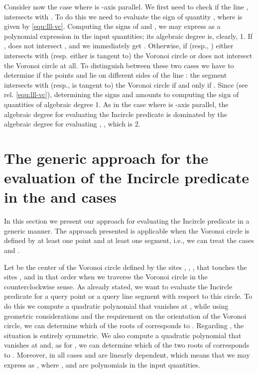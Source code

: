 \documentclass[letterpaper,11pt]{article}
\newcommand{\incircle}{\textsf{Incircle}\xspace}
\newcommand{\vor}{Voronoi\xspace}
\newcommand{\pps}{\xspace}
\newcommand{\pss}{\xspace}
\begin{document}
{Consider now the case where  is -axis parallel. We first need
to check if the line , intersects with . To do
this we need to evaluate the sign of quantity , where
 is given by \eqref{equ:lll-vc}. Computing the signs of
 and , we may express  as a
polynomial expression in the input quantities; its algebraic degree is,
clearly, 1. If ,  does not intersect
, and we immediately get .
Otherwise, if  (resp., )
 either intersects with (resp. either is tangent to) the
\vor circle or does not intersect the \vor circle at all. To
distinguish between these two cases we have to determine if the points
 and  lie on different sides of the line : the segment
 intersects with (resp., is tangent to) the \vor circle
 if and only if . Since
 (see rel. \eqref{equ:lll-vc}), determining
the signs  and  amounts to computing the
sign of quantities of algebraic degree 1. As in the case where  is
-axis parallel, the algebraic degree for evaluating the \incircle
predicate is dominated by the algebraic degree for evaluating
, , which is 2.




\section{The generic approach for the evaluation of the \incircle
  predicate in the \pps and \pss cases}\label{sec:generic}

In this section we present our approach for evaluating the
\incircle predicate in a generic manner. The approach presented is
applicable when the \vor circle is defined by at least one point and
at least one segment, i.e., we can treat the cases \pps and \pss.

Let  be the center of the Voronoi circle defined by the sites
, , , that touches the sites ,  and  in
that order when we traverse the \vor circle in the counterclockwise
sense.
As already stated, we want to evaluate the \incircle predicate for a
query point or a query line segment with respect to this circle.
To do this we compute a quadratic polynomial  that 
vanishes at , while using geometric considerations and the
requirement on the orientation of the \vor circle, we can determine
which of the roots  of  corresponds to . 
Regarding , the situation is entirely symmetric. We also
compute a quadratic polynomial  that vanishes at  and, as
for , we can determine which of the two roots  of
 corresponds to . Moreover, in all cases  and 
are linearly dependent, which means that we may express  as
, where ,
 and  are polynomials in the input quantities.

}
\end{document}
